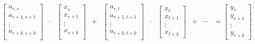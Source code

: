 $$
\begin{matrix}
  \begin{bmatrix}
    a_{r,s}     \\
    a_{r+1,s+1} \\
       \vdots   \\
    a_{r+k,s+k} \\
  \end{bmatrix} & \cdot & \begin{bmatrix}
                            x_s      \\
                            x_{s+1}  \\
                              \vdots \\
                            x_{s+k}  \\
                          \end{bmatrix} & + & \begin{bmatrix}
                                              a_{r,t}     \\
                                              a_{r+1,t+1} \\
                                                \vdots    \\
                                              a_{r+k,t+k} \\
                                              \end{bmatrix} & \cdot & \begin{bmatrix}
                                                                        x_t \\
                                                                        x_{t+1} \\
                                                                        \vdots \\
                                                                        x_{t+k}
                                                                      \end{bmatrix} & + & \cdots & = \begin{bmatrix}
                                                                                                         y_{r} \\
                                                                                                         y_{r+1} \\
                                                                                                         \vdots \\
                                                                                                         y_{r+k}
                                                                                                        \end{bmatrix}\\

\end{matrix}
$$
